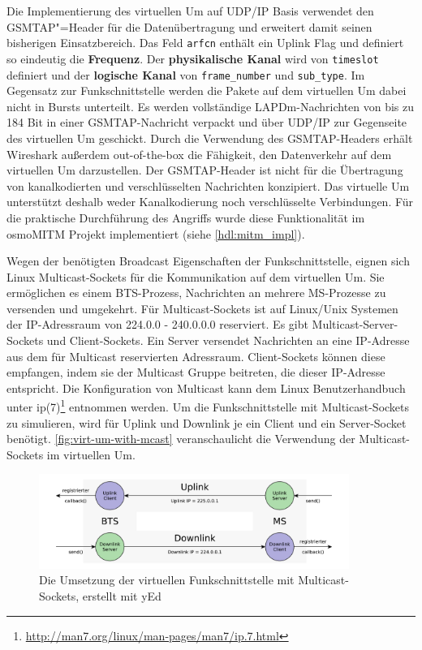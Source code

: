 Die Implementierung des virtuellen \ac{Um} auf \ac{UDP}/\ac{IP} Basis verwendet den \ac{GSMTAP}"=Header für die Datenübertragung und erweitert damit seinen bisherigen Einsatzbereich. Das Feld \texttt{arfcn} enthält ein Uplink Flag und definiert so eindeutig die \textbf{Frequenz}. Der \textbf{physikalische Kanal} wird von \texttt{timeslot} definiert und der \textbf{logische Kanal} von \texttt{frame\_number} und \texttt{sub\_type}. Im Gegensatz zur Funkschnittstelle werden die Pakete auf dem virtuellen \ac{Um} dabei nicht in Bursts unterteilt. Es werden vollständige \ac{LAPDm}-Nachrichten von bis zu 184 Bit in einer \ac{GSMTAP}-Nachricht verpackt und über \ac{UDP}/\ac{IP} zur Gegenseite des virtuellen \ac{Um} geschickt. Durch die Verwendung des \ac{GSMTAP}-Headers erhält Wireshark außerdem out-of-the-box die Fähigkeit, den Datenverkehr auf dem virtuellen \ac{Um} darzustellen. Der \ac{GSMTAP}-Header ist nicht für die Übertragung von kanalkodierten und verschlüsselten Nachrichten konzipiert. Das virtuelle \ac{Um} unterstützt deshalb weder Kanalkodierung noch verschlüsselte Verbindungen. Für die praktische Durchführung des Angriffs wurde diese Funktionalität im osmoMITM Projekt implementiert (siehe \autoref{hdl:mitm_impl}).

Wegen der benötigten Broadcast Eigenschaften der Funkschnittstelle, eignen sich Linux Multicast-Sockets für die Kommunikation auf dem virtuellen \ac{Um}. Sie ermöglichen es einem \ac{BTS}-Prozess, Nachrichten an mehrere \ac{MS}-Prozesse zu versenden und umgekehrt. Für Multicast-Sockets ist auf Linux/Unix Systemen der \ac{IP}-Adressraum von 224.0.0 - 240.0.0.0 reserviert. Es gibt Multicast-Server-Sockets und Client-Sockets. Ein Server versendet Nachrichten an eine \ac{IP}-Adresse aus dem für Multicast reservierten Adressraum. Client-Sockets können diese empfangen, indem sie der Multicast Gruppe beitreten, die dieser \ac{IP}-Adresse entspricht. Die Konfiguration von Multicast kann dem Linux Benutzerhandbuch unter ip(7)\footnote{\url{http://man7.org/linux/man-pages/man7/ip.7.html}} entnommen werden. Um die Funkschnittstelle mit Multicast-Sockets zu simulieren, wird für Uplink und Downlink je ein Client und ein Server-Socket benötigt. \autoref{fig:virt-um-with-mcast} veranschaulicht die Verwendung der Multicast-Sockets im virtuellen \ac{Um}.

\begin{figure}[H]
	\centering \includegraphics[width=0.9\textwidth]{figures/virt_um_with_multicast.pdf}
	\caption[Die Umsetzung der virtuellen Funkschnittstelle mit Multicast-Sockets]{Die Umsetzung der virtuellen Funkschnittstelle mit Multicast-Sockets, erstellt mit yEd} \label{fig:virt-um-with-mcast}
\end{figure}

